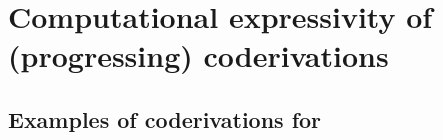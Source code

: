 \documentclass[manuscript,screen]{acmart}
\theoremstyle{definition}
\theoremstyle{remark}
\newcommand{\n}{N}
\newcommand{\sq}{\Box}
\newcommand{\sqn}{{\sq\n}}
\newcommand{\sn}{\sqn}
\newcommand{\lists}[3]{{#2},\overset{#1}{\ldots},{#3} }
\renewcommand{\succ}[1]{\mathsf{s}_{#1}}
\newcommand{\cnd}{\mathsf{cond}}
\newcommand{\model}[1]{\denot{#1}}
\newcommand{\denot}[1]{f_{#1}}
\newcommand{\saferec}{\mathsf{srec}}
\newcommand{\srec}{\saferec}
\newcommand{\seqar}{\Rightarrow}
\newcommand{\der}{\mathcal{D}}
\newcommand{\pder}[1]{\der_{#1}}
\newcommand{\id}{\mathsf{id}}
\newcommand{\wk}{\mathsf{w}}
\newcommand{\exch}{\mathsf{e}}
\newcommand{\cut}{\mathsf{cut}}
\newcommand{\boxlef}{\sq_l}
\newcommand{\boxrig}{\sq_r}
\newcommand{\sql}{\boxlef}
\newcommand{\sqr}{\boxrig}
\newcommand{\zero}{0}
\begin{document}











\section{Computational expressivity of (progressing) coderivations}
\label{sec:computational-strength}
\subsection{Examples of coderivations for~}
\end{document}
